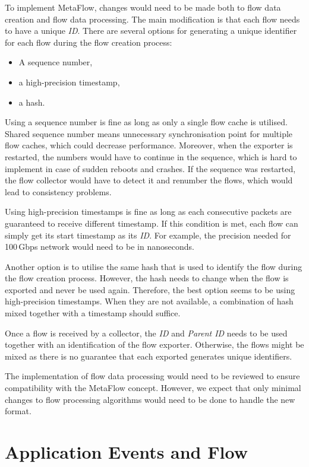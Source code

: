 To implement MetaFlow, changes would need to be made both to flow data creation and flow data processing. The main modification is that each flow needs to have a unique \emph{ID}. There are several options for generating a unique identifier for each flow during the flow creation process:
\begin{itemize}
    \item A sequence number,
    \item a high-precision timestamp,
    \item a hash.
\end{itemize}

Using a sequence number is fine as long as only a single flow cache is utilised. Shared sequence number means unnecessary synchronisation point for multiple flow caches, which could decrease performance. Moreover, when the exporter is restarted, the numbers would have to continue in the sequence, which is hard to implement in case of sudden reboots and crashes. If the sequence was restarted, the flow collector would have to detect it and renumber the flows, which would lead to consistency problems.

Using high-precision timestamps is fine as long as each consecutive packets are guaranteed to receive different timestamp. If this condition is met, each flow can simply get its start timestamp as its \emph{ID}. For example, the precision needed for 100\,Gbps network would need to be in nanoseconds.

Another option is to utilise the same hash that is used to identify the flow during the flow creation process. However, the hash needs to change when the flow is exported and never be used again. Therefore, the best option seems to be using high-precision timestamps. When they are not available, a combination of hash mixed together with a timestamp should suffice.

Once a flow is received by a collector, the \emph{ID} and \emph{Parent ID} needs to be used together with an identification of the flow exporter. Otherwise, the flows might be mixed as there is no guarantee that each exported generates unique identifiers.

The implementation of flow data processing would need to be reviewed to ensure compatibility with the MetaFlow concept. However, we expect that only minimal changes to flow processing algorithms would need to be done to handle the new format.

\section{Application Events and Flow}\label{sec:app-events}

